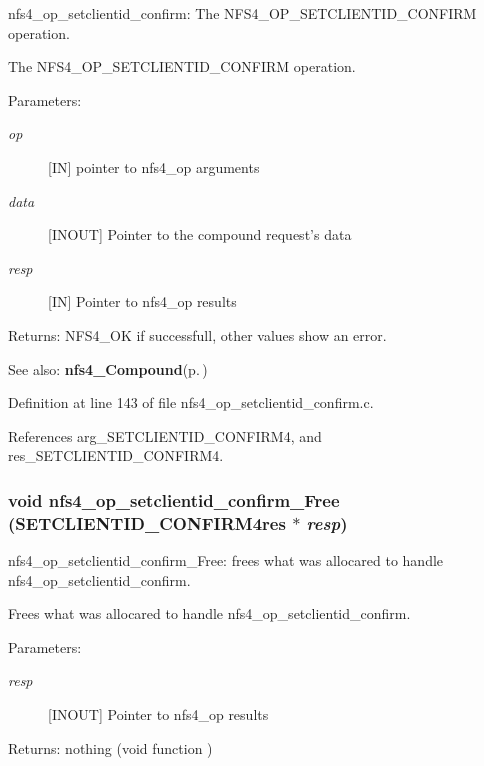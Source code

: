 nfs4\_\-op\_\-setclientid\_\-confirm: The NFS4\_\-OP\_\-SETCLIENTID\_\-CONFIRM operation.

The NFS4\_\-OP\_\-SETCLIENTID\_\-CONFIRM operation.

\begin{Desc}
\item[Parameters:]
\begin{description}
\item[{\em op}][IN] pointer to nfs4\_\-op arguments \item[{\em data}][INOUT] Pointer to the compound request's data \item[{\em resp}][IN] Pointer to nfs4\_\-op results\end{description}
\end{Desc}
\begin{Desc}
\item[Returns:]NFS4\_\-OK if successfull, other values show an error.\end{Desc}
\begin{Desc}
\item[See also:]{\bf nfs4\_\-Compound}{\rm (p.\,\pageref{nfs4__Compound_8c_a4})} \end{Desc}


Definition at line 143 of file nfs4\_\-op\_\-setclientid\_\-confirm.c.

References arg\_\-SETCLIENTID\_\-CONFIRM4, and res\_\-SETCLIENTID\_\-CONFIRM4.
\subsubsection{\setlength{\rightskip}{0pt plus 5cm}void nfs4\_\-op\_\-setclientid\_\-confirm\_\-Free (SETCLIENTID\_\-CONFIRM4res $\ast$ {\em resp})}\label{nfs4__op__setclientid__confirm_8c_a4}


nfs4\_\-op\_\-setclientid\_\-confirm\_\-Free: frees what was allocared to handle nfs4\_\-op\_\-setclientid\_\-confirm.

Frees what was allocared to handle nfs4\_\-op\_\-setclientid\_\-confirm.

\begin{Desc}
\item[Parameters:]
\begin{description}
\item[{\em resp}][INOUT] Pointer to nfs4\_\-op results\end{description}
\end{Desc}
\begin{Desc}
\item[Returns:]nothing (void function ) \end{Desc}


